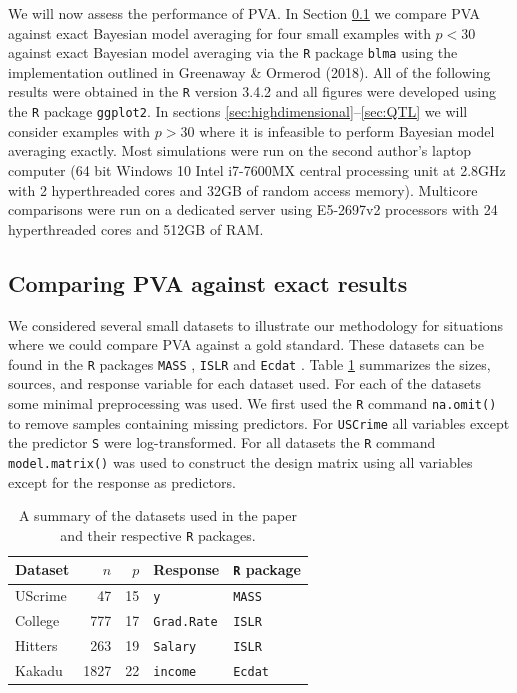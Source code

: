 We will now assess the performance of PVA. In Section \ref{sec:exact} we compare PVA 
against exact
Bayesian model averaging for four small examples with $p<30$ against exact Bayesian
model averaging via the {\tt R} package {\tt blma} using the implementation outlined 
in Greenaway \& Ormerod (2018). All of the following results were obtained in the 
{\tt R} version 3.4.2 \citep{CiteR} and all figures were developed using the {\tt R} 
package {\tt ggplot2}.
In sections \ref{sec:highdimensional}--\ref{sec:QTL}
we will consider examples with $p>30$ where
it is infeasible to perform Bayesian model averaging exactly. 
Most simulations were run on the second author's laptop computer (64 bit Windows 10 Intel
i7-7600MX central processing unit at 2.8GHz with 2 hyperthreaded cores and 32GB of random access memory). 
Multicore comparisons were run on a dedicated server using E5-2697v2 processors
with 24 hyperthreaded cores and 512GB of RAM.

\subsection{Comparing PVA against exact results} 
\label{sec:exact}

We considered several small datasets to illustrate our methodology for situations where
we could compare PVA against a gold standard. These datasets
can be found in the {\tt R} packages {\tt MASS} \citep{Venables2002},  {\tt ISLR} \cite{James:2014:ISL:2517747}
and {\tt Ecdat} \citep{Croissant2016}. Table \ref{tab:datasets} summarizes the sizes,  
sources, and response variable for each dataset used.   For each of the datasets some minimal preprocessing was used.
We first used the {\tt R} command {\tt na.omit()} to remove samples containing missing predictors. 
For {\tt USCrime} all variables except the predictor {\tt S} were log-transformed. For all datasets
the {\tt R} command {\tt model.matrix()} was used to construct the design matrix using all 
variables except for the response as predictors.

\begin{table}[ht!]
	\begin{center}
		\begin{tabular}{l|r|r|l|l}
			Dataset	& $n$ & $p$ & Response & {\tt R} package \\ 
			\hline 
			UScrime 	& 47 & 15 &  {\tt y} & {\tt MASS} \\  
			College &  777   & 17      &  {\tt Grad.Rate}      & {\tt ISLR} \\ 
			Hitters	& 263 & 19 & {\tt Salary} & {\tt ISLR} \\ 
			Kakadu	& 1827 & 22 & {\tt income} & {\tt Ecdat}   \\  
		\end{tabular} 
	\end{center}
	\caption{A summary of the datasets used in the paper and their respective {\tt R} packages.}
	\label{tab:datasets}
\end{table}


